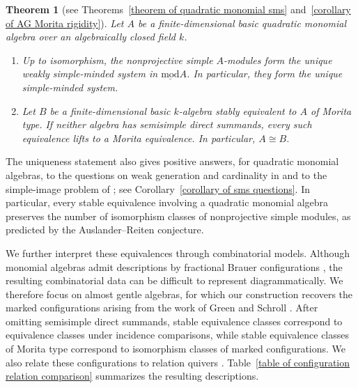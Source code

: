 \documentclass[11pt]{article}
\newcommand{\smod}{\operatorname{\underline{mod}}}
\newtheorem{theorem}{Theorem}[section]
\theoremstyle{definition}
\begin{document}
	\begin{theorem}[see Theorems~\ref{theorem of quadratic monomial sms}
		and~\ref{corollary of AG Morita rigidity}]
		\label{theorem of sms and Morita type}
		Let $A$ be a finite-dimensional basic quadratic monomial algebra over an algebraically closed field $k$.
		\begin{enumerate}
			\item Up to isomorphism, the nonprojective simple $A$-modules form the unique weakly simple-minded system in $\smod A$.  In particular, they form the unique simple-minded system.

			\item Let $B$ be a finite-dimensional basic $k$-algebra stably equivalent to $A$ of Morita type. If neither algebra has semisimple direct summands, every such equivalence lifts to a Morita equivalence. In particular, $A\cong B$.
		\end{enumerate}
	\end{theorem}

	The uniqueness statement also gives positive answers, for quadratic monomial algebras, to the questions on weak generation and cardinality in \cite{KL12} and to the simple-image problem of \cite{CKL15}; see Corollary~\ref{corollary of sms questions}.
	In particular, every stable equivalence involving a quadratic monomial algebra preserves the number of isomorphism classes of nonprojective simple modules, as predicted by the Auslander--Reiten conjecture.

	\medskip


	We further interpret these equivalences through combinatorial models. Although monomial algebras admit descriptions by fractional Brauer configurations \cite{LX26}, the resulting combinatorial data  can be difficult to represent diagrammatically. We therefore focus on almost gentle algebras, for which our construction recovers the marked configurations arising from the work of Green and Schroll \cite{GS19}.
	After omitting semisimple direct summands, stable equivalence classes correspond to equivalence classes under incidence comparisons, while stable equivalence classes of Morita type correspond to isomorphism classes of marked configurations.
	We also relate these configurations to relation quivers \cite{CSZ18,Che18}. Table~\ref{table of configuration relation comparison} summarizes the resulting descriptions.
\end{document}
